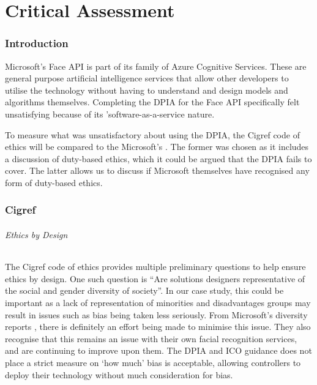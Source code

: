 \documentclass[12pt]{extarticle}
\begin{document}

\part{Critical Assessment}

\section{Introduction}

Microsoft's Face API is part of its family of Azure Cognitive Services. 
These are general purpose artificial intelligence services that allow other developers to utilise the technology without having to understand and design models and algorithms themselves. 
Completing the DPIA for the Face API specifically felt unsatisfying because of its 'software-as-a-service nature.

To measure what was unsatisfactory about using the DPIA, the Cigref code of ethics \cite{cigref} will be compared to the Microsoft's \cite{timeforaction}. The former was chosen as it includes a discussion of duty-based ethics, which it could be argued that the DPIA fails to cover. The latter allows us to discuss if Microsoft themselves have recognised any form of duty-based ethics.

\section{Cigref}

\paragraph{Ethics by Design}

The Cigref code of ethics provides multiple preliminary questions to help ensure ethics by design. 
One such question is ``Are solutions designers representative of the social and gender diversity of society''. 
In our case study, this could be important as a lack of representation of minorities and disadvantages groups may result in issues such as bias being taken less seriously. 
From Microsoft's diversity reports \cite{diversity}, there is definitely an effort being made to minimise this issue.
They also recognise that this remains an issue with their own facial recognition services, and are continuing to improve upon them.
The DPIA and ICO guidance does not place a strict measure on `how much' bias is acceptable, allowing controllers to deploy their technology without much consideration for bias. 
\end{document}
